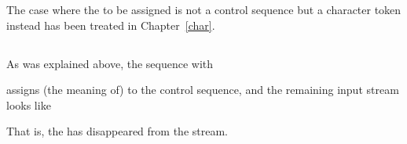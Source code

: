 \documentclass[letterpaper]{book}
\begin{document}
The case where the  to be assigned is not a control
sequence but a character token instead has been treated 
in Chapter~\ref{char}.

\subsection{\protect{}}

As was explained above, the sequence with 
\begin{disp}%
       \end{disp}
assigns (the meaning of)  to the control sequence, 
and the remaining input stream looks like
\begin{disp}\end{disp}
That is, the  has disappeared from the stream.
\end{document}
